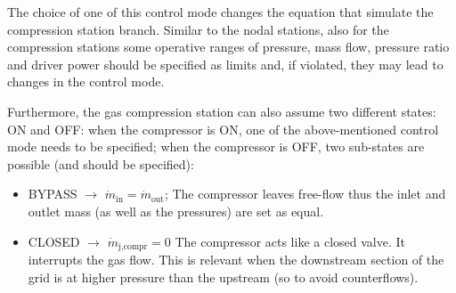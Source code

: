 The choice of one of this control mode changes the equation that simulate the compression station branch. 
Similar to the nodal stations, also for the compression stations some operative ranges of pressure, mass flow, pressure ratio and driver power should be specified as limits and, if violated, they may lead to changes in the control mode.

Furthermore, the gas compression station can also assume two different states: ON and OFF:
when the compressor is ON, one of the above-mentioned control mode needs to be specified;
when the compressor is OFF, two sub-states are possible (and should be specified):
\begin{itemize}
    \item BYPASS $\rightarrow$  $\dot{m}_{\text{in}}=\dot{m}_{\text{out}}$;  
    The compressor leaves free-flow thus the inlet and outlet mass (as well as the pressures) are set as equal.
    \item CLOSED $\rightarrow$  $\dot{m}_{\text{j,compr}}=0$
    The compressor acts like a closed valve. It interrupts the gas flow. This is relevant when the downstream section of the grid is at higher pressure than the upstream (so to avoid counterflows). 
\end{itemize}

